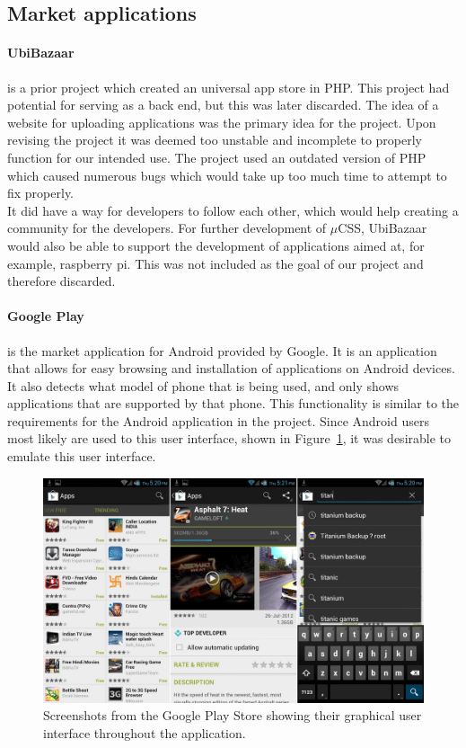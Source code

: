 \subsection{Market applications}
\label{sec:googleplay}
\paragraph{UbiBazaar} is a prior project which created an universal app store in PHP. This project had potential for serving as a back end, but this was later discarded. The idea of a website for uploading applications was the primary idea for the project. Upon revising the project it was deemed too unstable and incomplete to properly function for our intended use. The project used an outdated version of PHP which caused numerous bugs which would take up too much time to attempt to fix properly.\\

It did have a way for developers to follow each other, which would help creating a community for the developers. For further development of $\mu$CSS, UbiBazaar would also be able to support the development of applications aimed at, for example, raspberry pi. This was not included as the goal of our project and therefore discarded.

\paragraph{Google Play} is the market application for Android provided by Google. It is an application that allows for easy browsing and installation of applications on Android devices. It also detects what model of phone that is being used, and only shows applications that are supported by that phone. This functionality is similar to the requirements for the Android application in the project. Since Android users most likely are used to this user interface, shown in Figure~\ref{fig:googleplay}, it was desirable to emulate this user interface.\\

\begin{figure}[H]
\centering
\includegraphics[scale=0.2]{images/Google-Play-Store-APK-3-7-15.jpg}
\caption[Google Play]{Screenshots from the Google Play Store showing their graphical user interface throughout the application.}
\label{fig:googleplay}
\end{figure}

